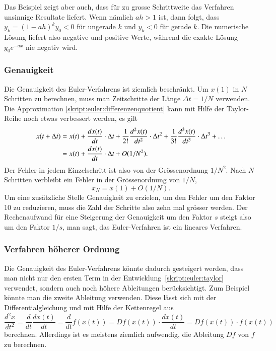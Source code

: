 Das Beispiel zeigt aber auch, dass für zu grosse Schrittweite das
Verfahren unsinnige Resultate liefert.
Wenn nämlich $ah>1$ ist, dann folgt, dass
$y_k=(1-ah)^k y_0  <0$ für ungerade $k$ und $y_k < 0$ für gerade $k$.
Die numerische Lösung liefert also negative und positive Werte,
während die exakte Lösung $y_0e^{-ax}$ nie negativ wird.

\subsubsection{Genauigkeit}
Die Genauigkeit des Euler-Verfahrens ist ziemlich beschränkt.
%
Um $x(1)$ in $N$ Schritten zu berechnen, muss man Zeitschritte der
Länge $\Delta t=1/N$ verwenden.
Die Approximation \eqref{skript:euler:differenzenquotient} kann mit
Hilfe der Taylor-Reihe noch etwas verbessert werden, es gilt
\begin{align}
x(t+\Delta t)
&=
x(t) + \frac{d x(t) }{dt}\cdot \Delta t
+ \frac{1}{2!}\frac{d^2x(t)}{dt^2}\cdot \Delta t^2
+ \frac{1}{3!}\frac{d^3x(t)}{dt^3}\cdot \Delta t^3
+\dots
\label{skript:euler:taylor}
\\
&=
x(t) + \frac{d x(t) }{dt}\cdot \Delta t
+ O(1/N^2).
\notag
\end{align}
Der Fehler in jedem Einzelschritt ist also von der Grössenordnung $1/N^2$.
Nach $N$ Schritten verbleibt ein Fehler in der Grössenordnung von $1/N$,
\[
x_N = x(1) + O(1/N).
\]
Um eine zusätzliche Stelle Genauigkeit zu erzielen, um den Fehler um
den Faktor 10 zu reduzieren, muss die Zahl der Schritte also zehn mal 
grösser werden.
Der Rechenaufwand für eine Steigerung der Genauigkeit um den Faktor
$s$ steigt also um den Faktor $1/s$, man sagt, das Euler-Verfahren ist
ein lineares Verfahren.

\subsubsection{Verfahren höherer Ordnung}
Die Genauigkeit des Euler-Verfahrens könnte dadurch gesteigert
werden, dass man nicht nur den ersten Term in der
Entwicklung~\eqref{skript:euler:taylor} verwendet, sondern auch
noch höhere Ableitungen berücksichtigt.
Zum Beispiel könnte man die zweite Ableitung verwenden.
Diese lässt sich mit der Differentialgleichung und mit Hilfe der Kettenregel
aus
\[
\frac{d^2x}{dt^2}
=
\frac{d}{dt} \frac{dx(t)}{dt}
=
\frac{d}{dt} f(x(t))
=
Df(x(t))\cdot \frac{dx(t)}{dt}
=
Df(x(t))\cdot f(x(t))
\]
berechnen.
Allerdings ist es meistens ziemlich aufwendig, die Ableitung $Df$ von $f$ zu
berechnen.

